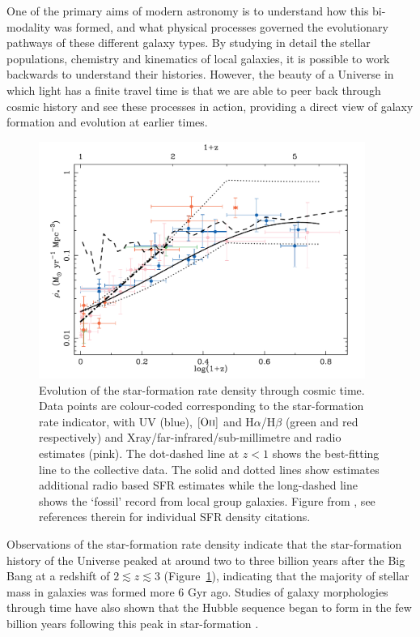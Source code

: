 One of the primary aims of modern astronomy is to understand how this bi-modality was formed, and what physical processes governed the evolutionary pathways of these different galaxy types. By studying in detail the stellar populations, chemistry and kinematics of local galaxies, it is possible to work backwards to understand their histories. However, the beauty of a Universe in which light has a finite travel time is that we are able to peer back through cosmic history and see these processes in action, providing a direct view of galaxy formation and evolution at earlier times. 

\begin{figure}
\centering
	  \includegraphics[width=0.95\textwidth]{Hopkins2004.pdf}
	  \caption[Evolution of the star-formation rate density through cosmic time.]{Evolution of the star-formation rate density through cosmic time. Data points are colour-coded corresponding to the star-formation rate indicator, with UV (blue), $[\rm{O}\textsc{ii}]$ and H$\alpha$/H$\beta$ (green and red respectively) and Xray/far-infrared/sub-millimetre and radio estimates (pink). The dot-dashed line at $z<1$ shows the best-fitting line to the collective data. The solid and dotted lines show estimates additional radio based SFR estimates while the long-dashed line shows the `fossil' record from local group galaxies. Figure from \citet{Hopkins:2004eu}, see references therein for individual SFR density citations. }
	  \label{fig:hopkins04}
\end{figure}

Observations of the star-formation rate density indicate that the star-formation history of the Universe peaked at around two to three billion years after the Big Bang at a redshift of $2 \lesssim z \lesssim 3$ (Figure~\ref{fig:hopkins04}), indicating that the majority of stellar mass in galaxies was formed more 6 Gyr ago. Studies of galaxy morphologies through time have also shown that the Hubble sequence began to form in the few billion years following this peak in star-formation \citep{Mortlock:2013dg}.

